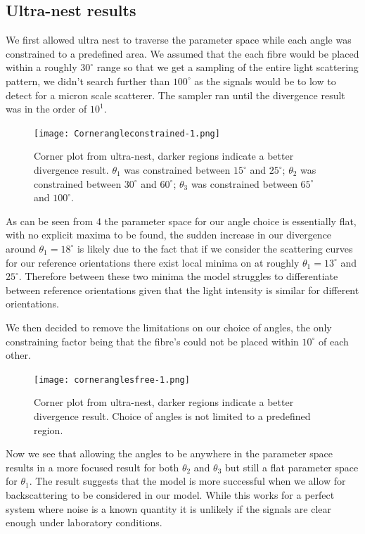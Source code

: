 \documentclass[11pt]{article}
\begin{document}
	\subsection*{Ultra-nest results}
	We first allowed ultra nest to traverse the parameter space while each angle was constrained to a predefined area. We assumed that the each fibre would be placed within a roughly $30^{\circ}$ range so that we get a sampling of the entire light scattering pattern, we didn't search further than $100^{\circ}$ as the signals would be to low to detect for a micron scale scatterer. The sampler ran until the divergence result was in the order of $10^1$.
	
	\begin{figure} [t]
		\centering
		\texttt{[image: Cornerangleconstrained-1.png]}
		\caption{Corner plot from ultra-nest, darker regions indicate a better divergence result. $\theta_1$ was constrained between $15^{\circ}$ and $25^{\circ}$; $\theta_2$ was constrained between $30^{\circ}$ and $60^{\circ}$; $\theta_3$ was constrained between $65^{\circ}$ and $100^{\circ}$.}
	\end{figure}
	As can be seen from \figurename{ 4} the parameter space for our angle choice is essentially flat, with no explicit maxima to be found, the sudden increase in our divergence around $\theta_1 = 18^{\circ}$ is likely due to the fact that if we consider the scattering curves for our reference orientations there exist local minima on at roughly $\theta_1 = 13^{\circ}$ and $25^{\circ}$. Therefore between these two minima the model struggles to differentiate between reference orientations given that the light intensity is similar for different orientations. 
	
	We then decided to remove the limitations on our choice of angles, the only constraining factor being that the fibre's could not be placed within $10^{\circ}$ of each other. 
	
	\begin{figure} [h]
		\centering
		\texttt{[image: corneranglesfree-1.png]}
		\caption{Corner plot from ultra-nest, darker regions indicate a better divergence result. Choice of angles is not limited to a predefined region.}
	\end{figure}

	Now we see that allowing the angles to be anywhere in the parameter space results in a more focused result for both $\theta_2$ and $\theta_3$ but still a flat parameter space for $\theta_1$. The result suggests that the model is more successful when we allow for backscattering to be considered in our model. While this works for a perfect system where noise is a known quantity it is unlikely if the signals are clear enough under laboratory conditions. 
	
\end{document}
